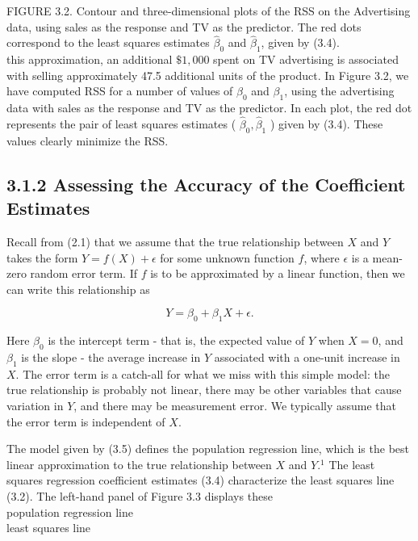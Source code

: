 \documentclass[10pt]{article}
\begin{document}
FIGURE 3.2. Contour and three-dimensional plots of the RSS on the Advertising data, using sales as the response and TV as the predictor. The red dots correspond to the least squares estimates $\hat{\beta}_{0}$ and $\hat{\beta}_{1}$, given by (3.4).\\
this approximation, an additional $\$ 1,000$ spent on TV advertising is associated with selling approximately 47.5 additional units of the product. In Figure 3.2, we have computed RSS for a number of values of $\beta_{0}$ and $\beta_{1}$, using the advertising data with sales as the response and TV as the predictor. In each plot, the red dot represents the pair of least squares estimates ( $\hat{\beta}_{0}, \hat{\beta}_{1}$ ) given by (3.4). These values clearly minimize the RSS.

\subsection*{3.1.2 Assessing the Accuracy of the Coefficient Estimates}
Recall from (2.1) that we assume that the true relationship between $X$ and $Y$ takes the form $Y=f(X)+\epsilon$ for some unknown function $f$, where $\epsilon$ is a mean-zero random error term. If $f$ is to be approximated by a linear function, then we can write this relationship as


\begin{equation*}
Y=\beta_{0}+\beta_{1} X+\epsilon . \tag{3.5}
\end{equation*}


Here $\beta_{0}$ is the intercept term - that is, the expected value of $Y$ when $X=0$, and $\beta_{1}$ is the slope - the average increase in $Y$ associated with a one-unit increase in $X$. The error term is a catch-all for what we miss with this simple model: the true relationship is probably not linear, there may be other variables that cause variation in $Y$, and there may be measurement error. We typically assume that the error term is independent of $X$.

The model given by (3.5) defines the population regression line, which is the best linear approximation to the true relationship between $X$ and $Y .{ }^{1}$ The least squares regression coefficient estimates (3.4) characterize the least squares line (3.2). The left-hand panel of Figure 3.3 displays these\\
population regression line\\
least squares line
\end{document}
